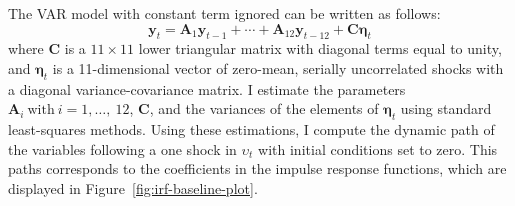 \documentclass[12pt,twoside]{reedthesis}
\begin{document}
The VAR model with constant term ignored can be written as follows:
\begin{equation}
  \bm y_{t} = \bm A_{1} \bm y_{t - 1} + \cdots + \bm A_{12} \bm y_{t - 12} + \bm C\bm \eta_{t}
\end{equation}
where \(\bm C\) is a \(11 \times 11\) lower triangular matrix with diagonal terms equal to unity, and \(\bm \eta_{t}\) is a 11-dimensional vector of zero-mean, serially uncorrelated shocks with a diagonal variance-covariance matrix. I estimate the parameters \(\bm A_{i} ~ \text{with} ~ i=1, \ldots, ~ 12\), \(\bm C\), and the variances of the elements of \(\bm \eta_{t}\) using standard least-squares methods. Using these estimations, I compute the dynamic path of the variables following a one shock in \(\upsilon_{t}\) with initial conditions set to zero. This paths corresponds to the coefficients in the impulse response functions, which are displayed in Figure~\ref{fig:irf-baseline-plot}.
\end{document}
